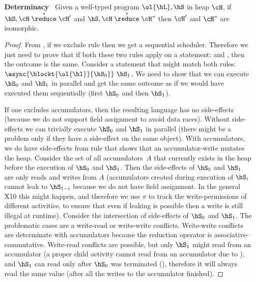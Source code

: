 \begin{Theorem}
\textbf{Determinacy~}
Given a well-typed program $\ol{\hL},\hS$ in heap $\cH$,
    if $\hS,\cH \stackrel{*}\reduce \cH'$ and $\hS,\cH \stackrel{*}\reduce \cH"$
    then $\cH'$ and $\cH"$ are isomorphic.
\end{Theorem}
\begin{proof}
From , if we exclude rule  then 
	we get a sequential scheduler.
Therefore we just need to prove that if both these two rules apply on a statement:
	 and ,
	then the outcome is the same.
Consider a statement that might match both rules:
	$\async{\blockt{\ol{\hl}}{\hS_0}}~\hS_1$.
We need to show that we can execute $\hS_0$ and $\hS_1$ in parallel and get the same outcome as if we would have executed
	them sequentially (first $\hS_0$ and then $\hS_1$).
	
If one excludes accumulators, then the resulting language has no side-effects (because we do not support field assignment to avoid data races).
Without side-effects we can trivially execute $\hS_0$ and $\hS_1$ in parallel
	(there might be a problem only if they have a side-effect on the same object).
With accumulators, we do have side-effects from rule  that shows that an accumulator-write mutates the heap.
Consider the set of all accumulators~$A$ that currently exists in the heap before the execution of $\hS_0$ and $\hS_1$.
Then the side-effects of $\hS_0$ and $\hS_1$ are only reads and writes from $A$ 
	(accumulators created during execution of $\hS_i$
	cannot leak to $\hS_{1-i}$ because we do not have field assignment.
	In the general X10 this might happen, and therefore we use $\pi$ to track the write-permissions of different activities,
	to ensure that even if leaking is possible then a write is still illegal at runtime).
Consider the intersection of side-effects of $\hS_0$ and $\hS_1$.
The problematic cases are a write-read or write-write conflicts.
Write-write conflicts are determinate with accumulators because the reduction operator is associative-commutative.
Write-read conflicts are possible, but only $\hS_1$ might read from an accumulator 
	(a proper child activity cannot read from an accumulator due to ),
	and $\hS_1$ can read only after $\hS_0$ was terminated (),
	therefore it will always read the same value (after all the writes to the accumulator finished).
\end{proof}


